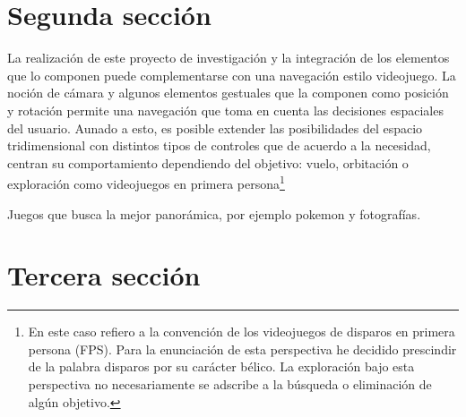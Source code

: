 \section{Segunda sección}


La realización de este proyecto de investigación y la integración de los elementos que lo componen puede complementarse con una navegación estilo videojuego. La noción de cámara y algunos elementos gestuales que la componen como posición y rotación permite una navegación que toma en cuenta las decisiones espaciales del usuario. Aunado a esto, es posible extender las posibilidades del espacio tridimensional con distintos tipos de controles que de acuerdo a la necesidad, centran su comportamiento dependiendo del objetivo: vuelo, orbitación o exploración como videojuegos en primera persona\footnote{En este caso refiero a la convención de los videojuegos de disparos en primera persona (FPS). Para la enunciación de esta perspectiva he decidido prescindir de la palabra disparos por su carácter bélico. La exploración bajo esta perspectiva no necesariamente se adscribe a la búsqueda o eliminación de algún objetivo.}

Juegos que busca la mejor panorámica, por ejemplo pokemon y fotografías. 

\section{Tercera sección} 




